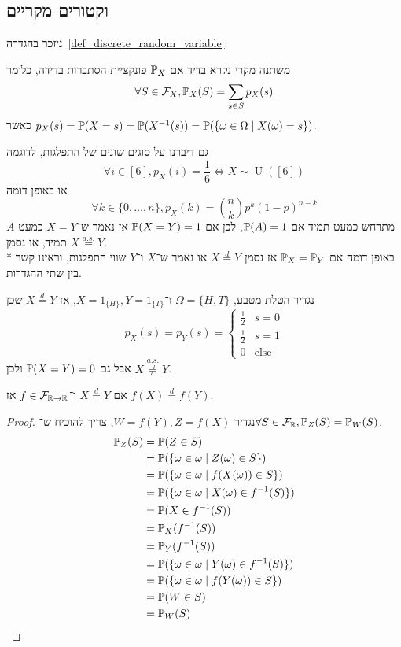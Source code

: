 \subsection{וקטורים מקריים}
ניזכר בהגדרה\ \ref{def_discrete_random_variable}:
\begin{definition*}
	משתנה מקרי נקרא בדיד אם $\mathbb{P}_X$ פונקציית הסתברות בדידה, כלומר
	\[
		\forall S \in \mathcal{F}_X, \mathbb{P}_X(S) = \sum_{s \in S} p_X(s)
	\]
	כאשר $p_X(s) = \mathbb{P}(X = s) = \mathbb{P}(X^{-1}(s)) = \mathbb{P}(\{\omega \in \Omega \mid X(\omega) = s \})$.
\end{definition*}
גם דיברנו על סוגים שונים של התפלגות, לדוגמה
\[
	\forall i \in [6], p_X(i) = \frac{1}{6} \iff X \sim \operatorname{U}([6])
\]
או באופן דומה
\[
	\forall k \in \{0, \dots, n\}, p_X(k) = \binom{n}{k} p^k {(1 - p)}^{n - k}
\]
$A$ מתרחש כמעט תמיד אם $\mathbb{P}(A) = 1$, לכן אם $\mathbb{P}(X = Y) = 1$ אז נאמר ש־$X = Y$ כמעט תמיד, או נסמן $X \overset{a.s.}{=} Y$. \\*
באופן דומה אם $\mathbb{P}_X = \mathbb{P}_Y$ אז נסמן $X \overset{d}{=} Y$ או נאמר ש־$X$ ו־$Y$ שווי התפלגות, וראינו קשר בין שתי ההגדרות.
\begin{example}
	נגדיר הטלת מטבע, $\Omega = \{H, T\}$ ו־$X = 1_{\{H\}}, Y = 1_{\{T\}}$, אז $X \overset{d}{=} Y$ שכן
	\[
		p_X(s) = p_Y(s) = \begin{cases}
			\frac{1}{2} & s = 0 \\
			\frac{1}{2} & s = 1 \\
			0 & \text{else}
		\end{cases}
	\]
	אבל גם $\mathbb{P}(X = Y) = 0$ ולכן $X \overset{a.s.}{\ne} Y$.
\end{example}
\begin{proposition}
	אם $X \overset{d}{=} Y$ ו־$f \in \mathcal{F}_{\mathbb{R} \to \mathbb{R}}$ אז $f(X) \overset{d}{=} f(Y)$.
\end{proposition}
\begin{proof}
	נגדיר $W = f(Y), Z = f(X)$,
	צריך להוכיח ש־$\forall S \in \mathcal{F}_{\mathbb{R}}, \mathbb{P}_Z(S) = \mathbb{P}_W(S)$.
	\begin{align*}
		\mathbb{P}_Z(S)
		& = \mathbb{P}(Z \in S) \\
		& = \mathbb{P}(\{\omega \in \omega \mid Z(\omega) \in S\}) \\
		& = \mathbb{P}(\{\omega \in \omega \mid f(X(\omega)) \in S\}) \\
		& = \mathbb{P}(\{\omega \in \omega \mid X(\omega) \in f^{-1}(S)\}) \\
		& = \mathbb{P}(X \in f^{-1}(S)) \\
		& = \mathbb{P}_X(f^{-1}(S)) \\
		& = \mathbb{P}_Y(f^{-1}(S)) \\
		& = \mathbb{P}(\{\omega \in \omega \mid Y(\omega) \in f^{-1}(S)\}) \\
		& = \mathbb{P}(\{\omega \in \omega \mid f(Y(\omega)) \in S\}) \\
		& = \mathbb{P}(W \in S) \\
		& = \mathbb{P}_W(S)
	\end{align*}
\end{proof}
